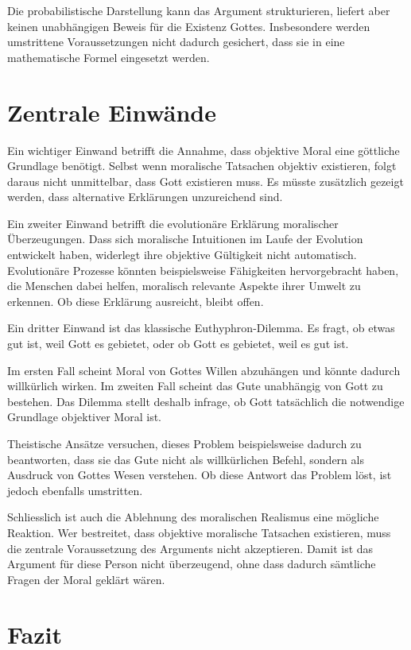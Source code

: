 \documentclass[11pt,a4paper]{article}
\begin{document}
	Die probabilistische Darstellung kann das Argument strukturieren, liefert aber keinen unabhängigen Beweis für die Existenz Gottes. Insbesondere werden umstrittene Voraussetzungen nicht dadurch gesichert, dass sie in eine mathematische Formel eingesetzt werden.
	
	\section{Zentrale Einwände}
	
	Ein wichtiger Einwand betrifft die Annahme, dass objektive Moral eine göttliche Grundlage benötigt. Selbst wenn moralische Tatsachen objektiv existieren, folgt daraus nicht unmittelbar, dass Gott existieren muss. Es müsste zusätzlich gezeigt werden, dass alternative Erklärungen unzureichend sind.
	
	Ein zweiter Einwand betrifft die evolutionäre Erklärung moralischer Überzeugungen. Dass sich moralische Intuitionen im Laufe der Evolution entwickelt haben, widerlegt ihre objektive Gültigkeit nicht automatisch. Evolutionäre Prozesse könnten beispielsweise Fähigkeiten hervorgebracht haben, die Menschen dabei helfen, moralisch relevante Aspekte ihrer Umwelt zu erkennen. Ob diese Erklärung ausreicht, bleibt offen.
	
	Ein dritter Einwand ist das klassische Euthyphron-Dilemma. Es fragt, ob etwas gut ist, weil Gott es gebietet, oder ob Gott es gebietet, weil es gut ist.
	
	Im ersten Fall scheint Moral von Gottes Willen abzuhängen und könnte dadurch willkürlich wirken. Im zweiten Fall scheint das Gute unabhängig von Gott zu bestehen. Das Dilemma stellt deshalb infrage, ob Gott tatsächlich die notwendige Grundlage objektiver Moral ist.
	
	Theistische Ansätze versuchen, dieses Problem beispielsweise dadurch zu beantworten, dass sie das Gute nicht als willkürlichen Befehl, sondern als Ausdruck von Gottes Wesen verstehen. Ob diese Antwort das Problem löst, ist jedoch ebenfalls umstritten.
	
	Schliesslich ist auch die Ablehnung des moralischen Realismus eine mögliche Reaktion. Wer bestreitet, dass objektive moralische Tatsachen existieren, muss die zentrale Voraussetzung des Arguments nicht akzeptieren. Damit ist das Argument für diese Person nicht überzeugend, ohne dass dadurch sämtliche Fragen der Moral geklärt wären.
	
	\section{Fazit}
	
\end{document}
